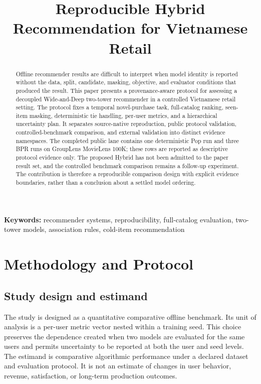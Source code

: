 \documentclass[10pt,a4paper]{article}
\title{Reproducible Hybrid Recommendation for Vietnamese Retail}
\author{}
\date{}
\begin{document}
\maketitle

\begin{abstract}
Offline recommender results are difficult to interpret when model identity is
reported without the data, split, candidate, masking, objective, and evaluator
conditions that produced the result. This paper presents a provenance-aware
protocol for assessing a decoupled Wide-and-Deep two-tower recommender in a
controlled Vietnamese retail setting. The protocol fixes a temporal
novel-purchase task, full-catalog ranking, seen-item masking, deterministic tie
handling, per-user metrics, and a hierarchical uncertainty plan. It separates
source-native reproduction, public protocol validation, controlled-benchmark
comparison, and external validation into distinct evidence namespaces. The
completed public lane contains one deterministic Pop run and three BPR runs on
GroupLens MovieLens 100K; these rows are reported as descriptive protocol
evidence only. The proposed Hybrid has not been admitted to the paper result
set, and the controlled benchmark comparison remains a follow-up experiment.
The contribution is therefore a reproducible comparison design with explicit
evidence boundaries, rather than a conclusion about a settled model ordering.
\end{abstract}

\noindent\textbf{Keywords:} recommender systems, reproducibility, full-catalog evaluation, two-tower models, association rules, cold-item recommendation



\section{Methodology and Protocol}

\subsection{Study design and estimand}

The study is designed as a quantitative comparative offline benchmark. Its unit
of analysis is a per-user metric vector nested within a training seed. This
choice preserves the dependence created when two models are evaluated for the
same users and permits uncertainty to be reported at both the user and seed
levels. The estimand is comparative algorithmic performance under a declared
dataset and evaluation protocol. It is not an estimate of changes in user
behavior, revenue, satisfaction, or long-term production outcomes.
\end{document}
